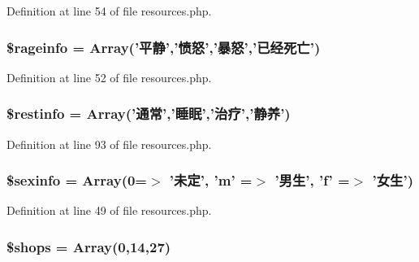 Definition at line 54 of file resources.\+php.

\hypertarget{resources_8php_a5f383706ecfe4033fc5ba410b5efe3a0}{
\subsubsection[{\$rageinfo}]{\setlength{\rightskip}{0pt plus 5cm}\$rageinfo = Array('平静','愤怒','暴怒','已经死亡')}}\label{resources_8php_a5f383706ecfe4033fc5ba410b5efe3a0}


Definition at line 52 of file resources.\+php.

\hypertarget{resources_8php_a9eadda2ba19f193cb5b6d373f4ec6e00}{
\subsubsection[{\$restinfo}]{\setlength{\rightskip}{0pt plus 5cm}\$restinfo = Array('通常','睡眠','治疗','静养')}}\label{resources_8php_a9eadda2ba19f193cb5b6d373f4ec6e00}


Definition at line 93 of file resources.\+php.

\hypertarget{resources_8php_a7fc213b5009edd4913f9a3f66776c721}{
\subsubsection[{\$sexinfo}]{\setlength{\rightskip}{0pt plus 5cm}\$sexinfo = Array(0=$>$ '未定', 'm' =$>$ '男生', 'f' =$>$ '女生')}}\label{resources_8php_a7fc213b5009edd4913f9a3f66776c721}


Definition at line 49 of file resources.\+php.

\hypertarget{resources_8php_a6a4f6f4fa7edf238e168beb18f0870af}{
\subsubsection[{\$shops}]{\setlength{\rightskip}{0pt plus 5cm}\$shops = Array(0,14,27)}}\label{resources_8php_a6a4f6f4fa7edf238e168beb18f0870af}


